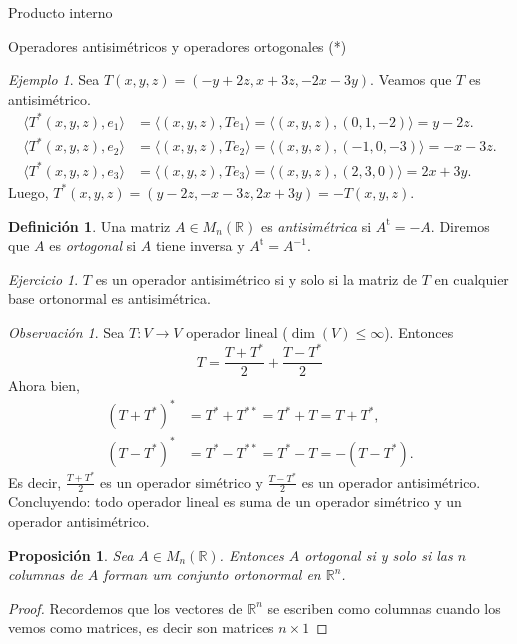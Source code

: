 \documentclass[a4paper,12pt,twoside,spanish,reqno]{amsbook}
\numberwithin{equation}{section}
\newtheorem{proposicion}[teorema]{Proposici\'on}
\theoremstyle{definition}
\newtheorem{definicion}[teorema]{Definici\'on}
\theoremstyle{remark}
\newtheorem*{ejemplo*}{Ejemplo}
\newtheorem*{ejercicio*}{Ejercicio}
\newtheorem*{obs*}{Observaci\'on}
\newcommand{\la}{\langle}
\newcommand{\ra}{\rangle}
\renewcommand{\t}{{\operatorname{t}}}
\newcommand{\R}{\mathbb R}
\begin{document}
\begin{chapter}{Producto interno}
\begin{section}{Operadores antisimétricos y operadores ortogonales (*)}
        \begin{ejemplo*}
            Sea $T(x,y,z) = (-y+2z,x+3z,-2x-3y)$. Veamos que $T$ es antisimétrico. 
            \begin{align*}
                \la T^*(x,y,z),e_1 \ra &= \la (x,y,z), Te_1 \ra = \la (x,y,z),(0,1,-2) \ra = y -2z. \\
                \la T^*(x,y,z),e_2 \ra &= \la (x,y,z), Te_2 \ra = \la (x,y,z),(-1,0,-3) \ra = -x -3z. \\	
                \la T^*(x,y,z),e_3 \ra &= \la (x,y,z), Te_3 \ra = \la (x,y,z),(2,3,0) \ra = 2x+3y. 
            \end{align*}
            Luego, $T^*(x,y,z) = (y-2z,-x-3z,2x+3y) = -T(x,y,z)$.	
        \end{ejemplo*}
            
        \begin{definicion}
            Una matriz  $A \in M_{n}(\R)$  es \textit{antisimétrica} si $A^{\t}= -A$. Diremos que  $A$  es \textit{ortogonal} si $A$ tiene inversa y $A^{\t}=A^{-1}$.
        \end{definicion}	
            
        \begin{ejercicio*} $T$  es un operador antisimétrico si y solo si la matriz de $T$ en cualquier base ortonormal es antisimétrica.
        
            
        \end{ejercicio*}
        
        \begin{obs*}
            Sea $T:V\to V$ operador lineal ($\dim(V)\le \infty$). Entonces 
            $$
            T = \frac{T+T^*}{2} + \frac{T-T^*}2
            $$ 
            Ahora bien, 
            \begin{align*}
                (T+T^*)^* &= T^* + T^{**} =T^* + T = T+T^*, \\
                (T-T^*)^* &= T^* - T^{**} =T^* - T = -(T-T^*).
            \end{align*}
         Es decir, $\displaystyle{\frac{T+T^*}{2}}$  es un  operador simétrico y  $\displaystyle{\frac{T-T^*}{2}}$ es un operador antisimétrico. Concluyendo: todo operador lineal es suma de un operador simétrico y un operador antisimétrico.  
        \end{obs*}
            
        
        
        \begin{proposicion} Sea $A \in  M_{n}(\R)$. Entonces $A$ ortogonal si y solo si  las $n$ columnas de $A$ forman um conjunto ortonormal en $\R^n$. 
        \end{proposicion} 
        \begin{proof}
            Recordemos que los vectores de $\R^n$ se escriben como columnas cuando los vemos como matrices,  es decir son matrices $n \times 1$
            

\end{proof}
\end{section}
\end{chapter}
\end{document}
